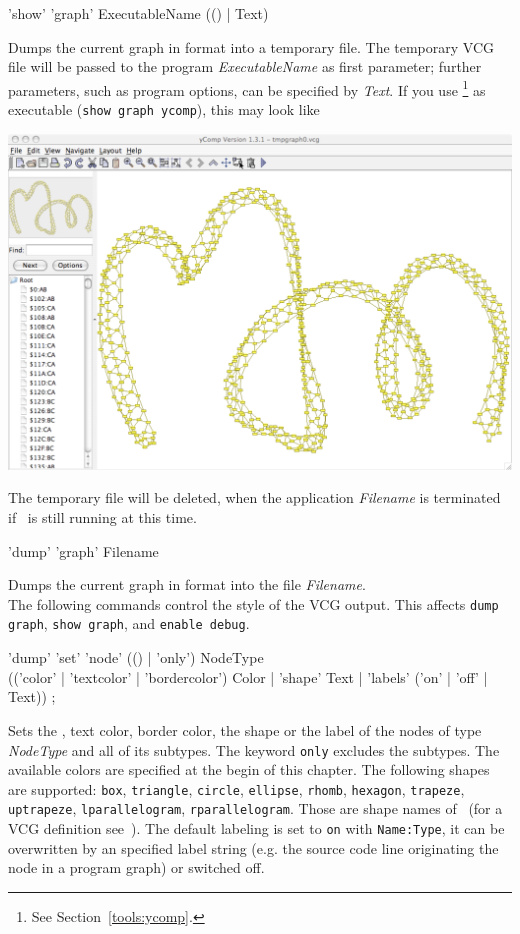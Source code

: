 \begin{rail}
  'show' 'graph' ExecutableName (() | Text)
\end{rail}
Dumps the current graph in  format into a temporary file.
The temporary VCG file will be passed to the program \emph{ExecutableName} as first parameter;
further parameters, such as program options, can be specified by \emph{Text}.
If you use \yComp\footnote{See Section~\ref{tools:ycomp}.} as executable (\texttt{show graph ycomp}), this may look like
\begin{center}
  \includegraphics[width=0.75\linewidth]{fig/showgraph}
\end{center}  
The temporary file will be deleted, when the application \emph{Filename} is terminated if \GrShell\ is still running at this time.

\begin{rail}
  'dump' 'graph' Filename
\end{rail}
Dumps the current graph in  format into the file \emph{Filename}.\\

The following commands control the style of the VCG output. This affects \texttt{dump graph}, \texttt{show graph}, and \texttt{enable debug}. 
\begin{rail}
  'dump' 'set' 'node' (() | 'only') NodeType \\ (('color' | 'textcolor' | 'bordercolor') Color | 'shape' Text | 'labels' ('on' | 'off' | Text)) ;
\end{rail}
Sets the , text color, border color, the shape or the label of the nodes of type \emph{NodeType} and all of its subtypes.
The keyword \texttt{only} excludes the subtypes. The available colors are specified at the begin of this chapter. 
The following shapes are supported: \texttt{box}, \texttt{triangle}, \texttt{circle}, \texttt{ellipse}, \texttt{rhomb}, \texttt{hexagon}, \texttt{trapeze}, \texttt{uptrapeze}, \texttt{lparallelogram}, \texttt{rparallelogram}.
Those are shape names of \yComp\ (for a VCG definition see~\cite{vcg}).
The default labeling is set to \texttt{on} with \texttt{Name:Type}, it can be overwritten by an specified label string (e.g. the source code line originating the node in a program graph) or switched off.

